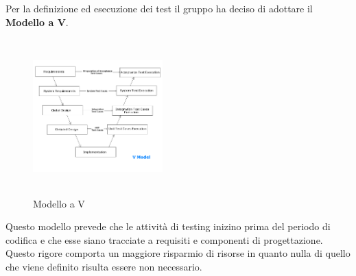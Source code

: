 \documentclass[PianoDiQualifica.tex]{subfiles}
\begin{document}
\newpage
Per la definizione ed esecuzione dei test il gruppo ha deciso di adottare il \textbf{Modello a V}.

\begin{figure}[htbp]
	\centering
	\includegraphics[height=6cm,width=5cm]{v-model.png}
	\caption{Modello a V}
\end{figure}

Questo modello prevede che le attività di testing inizino prima del periodo di codifica e che esse siano tracciate a requisiti e componenti di progettazione. 
Questo rigore comporta un maggiore risparmio di risorse in quanto nulla di quello che viene definito risulta essere non necessario.



	
	
	
	
	
	
	
	
	
	
\end{document}
